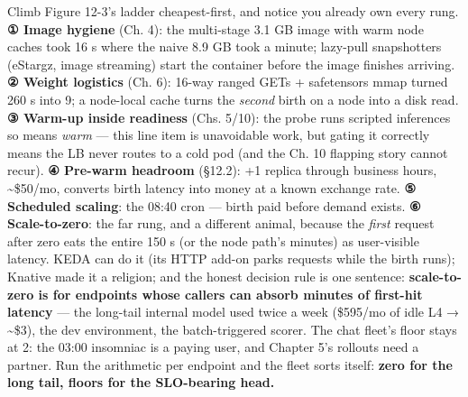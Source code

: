 Climb Figure 12-3's ladder cheapest-first, and notice you already own every rung. \textbf{① Image hygiene} (Ch. 4): the multi-stage 3.1 GB image with warm node caches took 16 s where the naive 8.9 GB took a minute; lazy-pull snapshotters (eStargz, image streaming) start the container before the image finishes arriving. \textbf{② Weight logistics} (Ch. 6): 16-way ranged GETs + safetensors mmap turned 260 s into 9; a node-local cache turns the \textit{second} birth on a node into a disk read. \textbf{③ Warm-up inside readiness} (Chs. 5/10): the probe runs scripted inferences so  means \textit{warm} — this line item is unavoidable work, but gating it correctly means the LB never routes to a cold pod (and the Ch. 10 flapping story cannot recur). \textbf{④ Pre-warm headroom} (§12.2): +1 replica through business hours, \textasciitilde{}\$50/mo, converts birth latency into money at a known exchange rate. \textbf{⑤ Scheduled scaling}: the 08:40 cron — birth paid before demand exists. \textbf{⑥ Scale-to-zero}: the far rung, and a different animal, because the \textit{first} request after zero eats the entire 150 s (or the node path's minutes) as user-visible latency. KEDA can do it (its HTTP add-on parks requests while the birth runs); Knative made it a religion; and the honest decision rule is one sentence: \textbf{scale-to-zero is for endpoints whose callers can absorb minutes of first-hit latency} — the long-tail internal model used twice a week (\$595/mo of idle L4 → \textasciitilde{}\$3), the dev environment, the batch-triggered scorer. The chat fleet's floor stays at 2: the 03:00 insomniac is a paying user, and Chapter 5's rollouts need a partner. Run the arithmetic per endpoint and the fleet sorts itself: \textbf{zero for the long tail, floors for the SLO-bearing head.}

